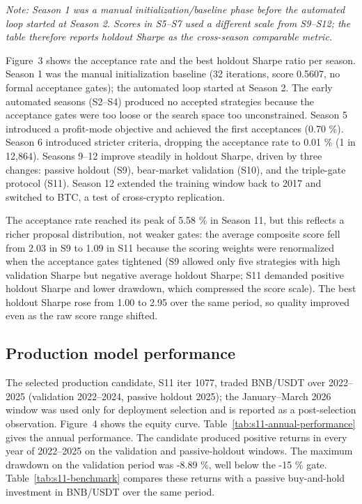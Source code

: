 \documentclass[analytics,article,submit,pdftex,moreauthors]{Definitions/mdpi}
\begin{document}
\emph{Note: Season 1 was a manual initialization/baseline phase before the automated loop started at Season 2. Scores in S5--S7 used a different scale from S9--S12; the table therefore reports holdout Sharpe as the cross-season comparable metric.}

Figure~3 shows the acceptance rate and the best holdout Sharpe ratio per season. Season 1 was the manual initialization baseline (32 iterations, score 0.5607, no formal acceptance gates); the automated loop started at Season 2. The early automated seasons (S2--S4) produced no accepted strategies because the acceptance gates were too loose or the search space too unconstrained. Season 5 introduced a profit-mode objective and achieved the first acceptances (0.70 \%). Season 6 introduced stricter criteria, dropping the acceptance rate to 0.01 \% (1 in 12,864). Seasons 9--12 improve steadily in holdout Sharpe, driven by three changes: passive holdout (S9), bear-market validation (S10), and the triple-gate protocol (S11). Season 12 extended the training window back to 2017 and switched to BTC, a test of cross-crypto replication.

The acceptance rate reached its peak of 5.58 \% in Season 11, but this reflects a richer proposal distribution, not weaker gates: the average composite score fell from 2.03 in S9 to 1.09 in S11 because the scoring weights were renormalized when the acceptance gates tightened (S9 allowed only five strategies with high validation Sharpe but negative average holdout Sharpe; S11 demanded positive holdout Sharpe and lower drawdown, which compressed the score scale). The best holdout Sharpe rose from 1.00 to 2.95 over the same period, so quality improved even as the raw score range shifted.

\subsection{Production model performance}\label{production-model-performance}

The selected production candidate, S11 iter 1077, traded BNB/USDT over 2022--2025 (validation 2022--2024, passive holdout 2025); the January--March 2026 window was used only for deployment selection and is reported as a post-selection observation. Figure~4 shows the equity curve. Table~\ref{tab:s11-annual-performance} gives the annual performance. The candidate produced positive returns in every year of 2022--2025 on the validation and passive-holdout windows. The maximum drawdown on the validation period was -8.89 \%, well below the -15 \% gate. Table~\ref{tab:s11-benchmark} compares these returns with a passive buy-and-hold investment in BNB/USDT over the same period.
\end{document}
